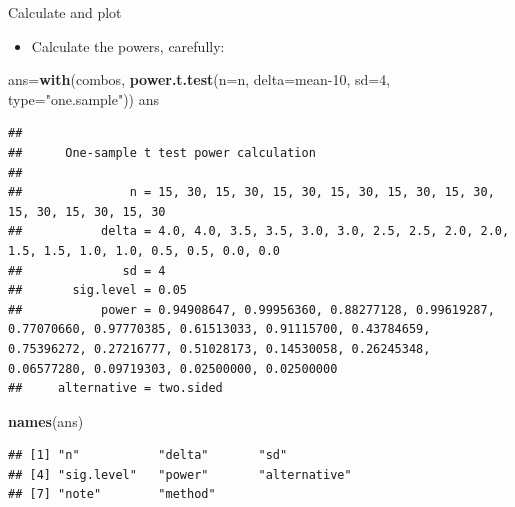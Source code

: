 \documentclass[ignorenonframetext,]{beamer}
\newenvironment{Shaded}{\begin{snugshade}}{\end{snugshade}}
\newcommand{\DataTypeTok}[1]{\textcolor[rgb]{0.13,0.29,0.53}{#1}}
\newcommand{\DecValTok}[1]{\textcolor[rgb]{0.00,0.00,0.81}{#1}}
\newcommand{\KeywordTok}[1]{\textcolor[rgb]{0.13,0.29,0.53}{\textbf{#1}}}
\newcommand{\NormalTok}[1]{#1}
\newcommand{\OperatorTok}[1]{\textcolor[rgb]{0.81,0.36,0.00}{\textbf{#1}}}
\newcommand{\StringTok}[1]{\textcolor[rgb]{0.31,0.60,0.02}{#1}}
\providecommand{\tightlist}{%
  \setlength{\itemsep}{0pt}\setlength{\parskip}{0pt}}
\begin{document}
\begin{frame}[fragile]{Calculate and plot}
\protect\hypertarget{calculate-and-plot}{}

\begin{itemize}
\tightlist
\item
  Calculate the powers, carefully:
\end{itemize}

\begin{Shaded}
\begin{Highlighting}[]
\NormalTok{ans=}\KeywordTok{with}\NormalTok{(combos, }\KeywordTok{power.t.test}\NormalTok{(}\DataTypeTok{n=}\NormalTok{n, }\DataTypeTok{delta=}\NormalTok{mean}\DecValTok{-10}\NormalTok{, }\DataTypeTok{sd=}\DecValTok{4}\NormalTok{, }
                              \DataTypeTok{type=}\StringTok{"one.sample"}\NormalTok{))}
\NormalTok{ans}
\end{Highlighting}
\end{Shaded}

\begin{verbatim}
## 
##      One-sample t test power calculation 
## 
##               n = 15, 30, 15, 30, 15, 30, 15, 30, 15, 30, 15, 30, 15, 30, 15, 30, 15, 30
##           delta = 4.0, 4.0, 3.5, 3.5, 3.0, 3.0, 2.5, 2.5, 2.0, 2.0, 1.5, 1.5, 1.0, 1.0, 0.5, 0.5, 0.0, 0.0
##              sd = 4
##       sig.level = 0.05
##           power = 0.94908647, 0.99956360, 0.88277128, 0.99619287, 0.77070660, 0.97770385, 0.61513033, 0.91115700, 0.43784659, 0.75396272, 0.27216777, 0.51028173, 0.14530058, 0.26245348, 0.06577280, 0.09719303, 0.02500000, 0.02500000
##     alternative = two.sided
\end{verbatim}

\begin{Shaded}
\begin{Highlighting}[]
\KeywordTok{names}\NormalTok{(ans)}
\end{Highlighting}
\end{Shaded}

\begin{verbatim}
## [1] "n"           "delta"       "sd"         
## [4] "sig.level"   "power"       "alternative"
## [7] "note"        "method"
\end{verbatim}

\begin{Shaded}
\end{Shaded}


\end{frame}
\end{document}
